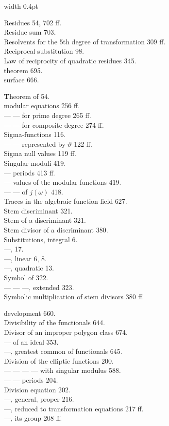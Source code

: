 \hfill\vrule width 0.4pt\hfill
\begin{minipage}[t]{0.48\textwidth}
\noindent Residues 54, 702 ff.\\
Residue sum 703.\\
Resolvents for the 5th degree of transformation 309 ff.\\
Reciprocal substitution 98.\\
Law of reciprocity of quadratic residues 345.\\
 theorem 695.\\
 surface 666.

\noindent \textbf{T}heorem of  54.\\
 modular equations 256 ff.\\
--- --- for prime degree 265 ff.\\
--- --- for composite degree 274 ff.\\
Sigma-functions 116.\\
--- --- represented by $\vartheta$ 122 ff.\\
Sigma null values 119 ff.\\
Singular moduli 419.\\
--- periods 413 ff.\\
--- values of the modular functions 419.\\
--- --- of $j(\omega)$ 418.\\
Traces in the algebraic function field 627.\\
Stem discriminant 321.\\
Stem of a discriminant 321.\\
Stem divisor of a discriminant 380.\\
Substitutions, integral 6.\\
---,  17.\\
---, linear 6, 8.\\
---, quadratic 13.\\
Symbol of  322.\\
--- --- ---, extended 323.\\
Symbolic multiplication of stem divisors 380 ff.

\noindent {} development 660.\\
Divisibility of the functionals 644.\\
Divisor of an improper polygon class 674.\\
--- of an ideal 353.\\
---, greatest common of functionals 645.\\
Division of the elliptic functions 200.\\
--- --- --- --- with singular modulus 588.\\
--- --- periods 204.\\
Division equation 202.\\
---, general, proper 216.\\
---, reduced to transformation equations 217 ff.\\
---, its group 208 ff.
\end{minipage}
